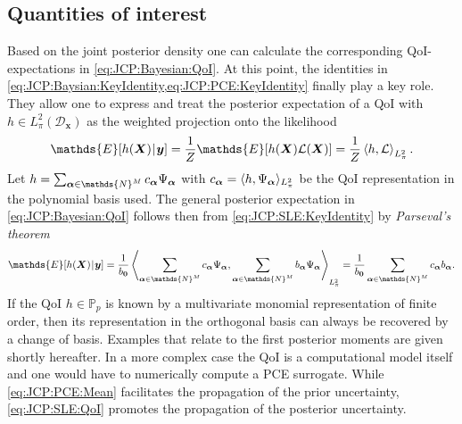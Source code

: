 \subsection{Quantities of interest}
Based on the joint posterior density one can calculate the corresponding QoI-expectations in \cref{eq:JCP:Bayesian:QoI}.
At this point, the identities in \cref{eq:JCP:Baysian:KeyIdentity,eq:JCP:PCE:KeyIdentity} finally play a key role.
They allow one to express and treat the posterior expectation of a QoI with \(h \in  L_{\pi}^2(\mathcal{D}_{\bm{x}})\) as the weighted projection onto the likelihood
\begin{equation} \label{eq:JCP:SLE:KeyIdentity}
  \mathds{E}[h(\bm{X}) \cond \bm{y}]
  = \frac{1}{\scale} \mathds{E}[h(\bm{X}) \mathcal{L}(\bm{X})]
  = \frac{1}{\scale} \left\langle h, \mathcal{L} \right\rangle_{L_{\pi}^2}.
\end{equation}
Let \(h = \sum_{\bm{\alpha} \in \mathds{N}^\dimParam} \coeffH_{\bm{\alpha}} \basis_{\bm{\alpha}}\)
with \(c_{\bm{\alpha}} = \langle h, \Psi_{\bm{\alpha}} \rangle_{L_{\pi}^2}\) be the QoI representation in the polynomial basis used.
The general posterior expectation in \cref{eq:JCP:Bayesian:QoI} follows then from \cref{eq:JCP:SLE:KeyIdentity} by \emph{Parseval's theorem}
\begin{equation} \label{eq:JCP:SLE:QoI}
  \mathds{E}[h(\bm{X}) \cond \bm{y}]
  = \frac{1}{\coeffL_{\bm{0}}} \left\langle \sum\limits_{\bm{\alpha} \in \mathds{N}^\dimParam} \coeffH_{\bm{\alpha}} \basis_{\bm{\alpha}}
  ,\sum\limits_{\bm{\alpha} \in \mathds{N}^\dimParam} \coeffL_{\bm{\alpha}} \basis_{\bm{\alpha}} \right\rangle_{L_{\pi}^2}
  = \frac{1}{\coeffL_{\bm{0}}} \sum\limits_{\bm{\alpha} \in \mathds{N}^\dimParam} \coeffH_{\bm{\alpha}} \coeffL_{\bm{\alpha}}.
\end{equation}
If the QoI \(h \in \mathds{P}_p\) is known by a multivariate monomial representation of finite order,
then its representation in the orthogonal basis can always be recovered by a change of basis.
Examples that relate to the first posterior moments are given shortly hereafter.
In a more complex case the QoI is a computational model itself and one would have to numerically compute a PCE surrogate.
While \cref{eq:JCP:PCE:Mean} facilitates the propagation of the prior uncertainty, \cref{eq:JCP:SLE:QoI} promotes the propagation of the posterior uncertainty.

